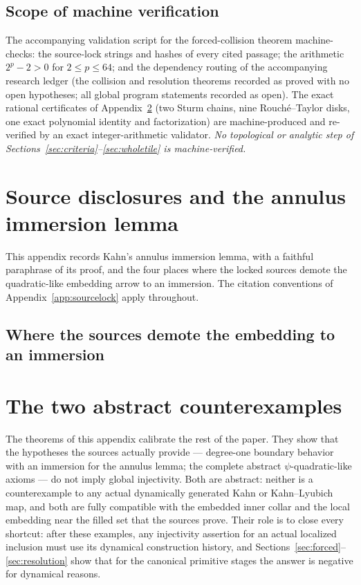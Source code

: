 \documentclass[11pt,reqno]{amsart}
\theoremstyle{definition}
\theoremstyle{remark}
\begin{document}

\subsection*{Scope of machine verification}
The accompanying validation script for the forced-collision theorem
machine-checks: the source-lock strings and hashes of every cited
passage; the arithmetic $2^{p}-2>0$ for $2\le p\le64$; and the
dependency routing of the accompanying research ledger (the collision
and resolution theorems recorded as proved with no open hypotheses;
all global program statements recorded as open).  The exact rational
certificates of Appendix~\ref{sec:abstract} (two Sturm chains, nine
Rouch\'e--Taylor disks, one exact polynomial identity and
factorization) are machine-produced and re-verified by an exact
integer-arithmetic validator.  \emph{No topological or analytic step
of Sections~\ref{sec:criteria}--\ref{sec:wholetile} is
machine-verified.}

\appendix

\section{Source disclosures and the annulus immersion lemma}
\label{sec:disclosures}

This appendix records Kahn's annulus immersion lemma, with a faithful
paraphrase of its proof, and the four places where the locked sources
demote the quadratic-like embedding arrow to an immersion.  The
citation conventions of Appendix~\ref{app:sourcelock} apply throughout.


\subsection*{Where the sources demote the embedding to an immersion}

\section{The two abstract counterexamples}
\label{sec:abstract}

The theorems of this appendix calibrate the rest of the paper.  They
show that the hypotheses the sources actually provide --- degree-one
boundary behavior with an immersion for the annulus lemma; the complete
abstract $\psi$-quadratic-like axioms --- do not imply global
injectivity.  Both are abstract: neither is a counterexample to any
actual dynamically generated Kahn or Kahn--Lyubich map, and both are
fully compatible with the embedded inner collar and the local embedding
near the filled set that the sources prove.  Their role is to close
every shortcut: after these examples, any injectivity assertion for an
actual localized inclusion must use its dynamical construction history,
and Sections~\ref{sec:forced}--\ref{sec:resolution} show that for the
canonical primitive stages the answer is negative for dynamical
reasons.
\end{document}
